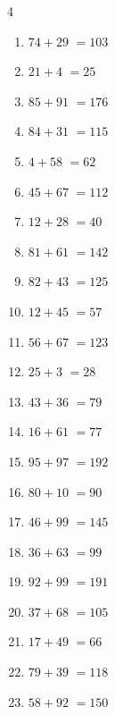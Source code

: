 \begin{multicols}{4}
\begin{enumerate}
  \item $74+29$
        $=103$

  \item $21+4$
        $=25$

  \item $85+91$
        $=176$

  \item $84+31$
        $=115$

  \item $4+58$
        $=62$

  \item $45+67$
        $=112$

  \item $12+28$
        $=40$

\columnbreak %

  \item $81+61$
        $=142$

  \item $82+43$
        $=125$

  \item $12+45$
        $=57$

  \item $56+67$
        $=123$

  \item $25+3$
        $=28$

  \item $43+36$
        $=79$

  \item $16+61$
        $=77$

  \item $95+97$
        $=192$

  \item $80+10$
        $=90$

  \item $46+99$
        $=145$

  \item $36+63$
        $=99$

  \item $92+99$
        $=191$

  \item $37+68$
        $=105$

  \item $17+49$
        $=66$

  \item $79+39$
        $=118$

  \item $58+92$
        $=150$


\end{enumerate}
\end{multicols}
